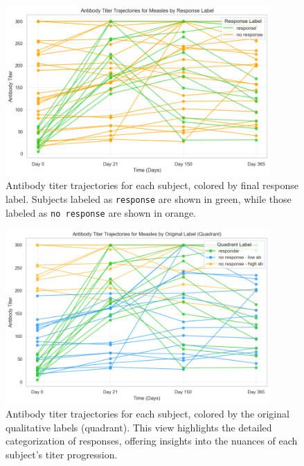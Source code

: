 \documentclass[12pt,a4paper]{report}
\begin{document}
\begin{figure}[H]
\centering
\includegraphics[width=0.9\textwidth]{images/Antibody_Titer_Trajectories_for_Measles_by_Response_Label.png}
\caption[Antibody Titer Trajectories by Response Label]{Antibody titer trajectories for each subject, colored by final response label. Subjects labeled as \texttt{response} are shown in green, while those labeled as \texttt{no response} are shown in orange.}
\label{fig:titer_response_label}
\end{figure}

\begin{figure}[H]
\centering
\includegraphics[width=0.9\textwidth]{images/Antibody_Titer_Trajectories_for_Measles_by_Original_Label_(Quadrant).png}
\caption[Antibody Titer Trajectories by Original Label (Quadrant)]{Antibody titer trajectories for each subject, colored by the original qualitative labels (quadrant). This view highlights the detailed categorization of responses, offering insights into the nuances of each subject’s titer progression.}
\label{fig:titer_original_label}
\end{figure}
\end{document}
